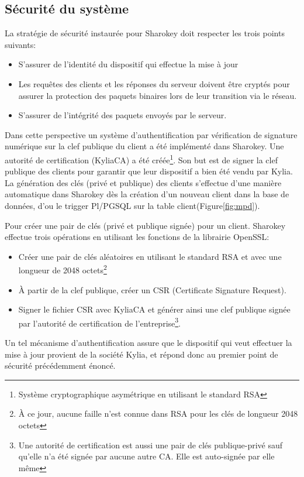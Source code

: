 \documentclass{themeensg}
\begin{document}
\subsection{Sécurité du système}
La stratégie de sécurité instaurée pour Sharokey doit respecter les trois points suivants:
\begin{itemize}
\item S'assurer de l'identité du dispositif qui effectue la mise à jour
\item Les requêtes des clients et les réponses du serveur doivent être cryptés pour assurer la protection des paquets binaires lors de leur transition via le réseau.
\item S'assurer de l'intégrité des paquets envoyés par le serveur.
\end{itemize}
Dans cette perspective un système d'authentification par vérification de signature numérique sur la clef publique du client a été implémenté dans Sharokey. Une autorité de certification (KyliaCA) a été créée\footnote{Système cryptographique asymétrique en utilisant le standard RSA}. Son but est de signer la clef publique des clients pour garantir que leur dispositif a bien été vendu par Kylia. La génération des clés (privé et publique) des clients s'effectue d'une manière automatique dans Sharokey dès la création d'un nouveau client dans la base de données, d'ou le trigger Pl/PGSQL sur la table client(Figure\ref{fig:mpd}).

Pour créer une pair de clés (privé et publique signée) pour un client. Sharokey effectue trois opérations en utilisant les fonctions de la librairie OpenSSL:
\begin{itemize}
\item Créer une pair de clés aléatoires en utilisant le standard RSA et avec une longueur de 2048 octets\footnote{À ce jour, aucune faille n'est connue dans RSA pour les clés de longueur 2048 octets}
\item À partir de la clef publique, créer un CSR (Certificate Signature Request).
\item Signer le fichier CSR avec KyliaCA et générer ainsi une clef publique signée par l'autorité de certification de l'entreprise\footnote{Une autorité de certification est aussi une pair de clés publique-privé sauf qu'elle n'a été signée par aucune autre CA. Elle est auto-signée par elle même}.
\end{itemize}
Un tel mécanisme d'authentification assure que le dispositif qui veut effectuer la mise à jour provient de la société Kylia, et répond donc au premier point de sécurité précédemment énoncé.
\end{document}
